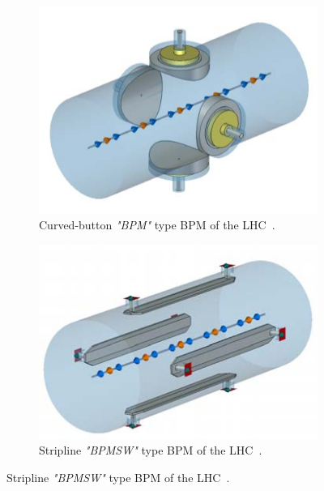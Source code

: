 \begin{figure}[H]
    \centering
    \begin{subfigure}[b]{0.45\textwidth}
        \includegraphics[width=\textwidth]{images/lhc_bpm_button.jpg}
        \caption{Curved-button \textit{"BPM"} type BPM of the LHC~\cite{wendt_bpm_2020}.}
        \label{fig:beam_instrumentation_bpm_button}
    \end{subfigure}
    \hfill
    \begin{subfigure}[b]{0.45\textwidth}
        \includegraphics[width=\textwidth]{images/lhc_bpm_stripline.jpg}
        \caption{Stripline \textit{"BPMSW"} type BPM of the LHC~\cite{wendt_bpm_2020}.}
        \label{fig:beam_instrumentation_bpm_stripline}
    \end{subfigure}
\end{figure}

